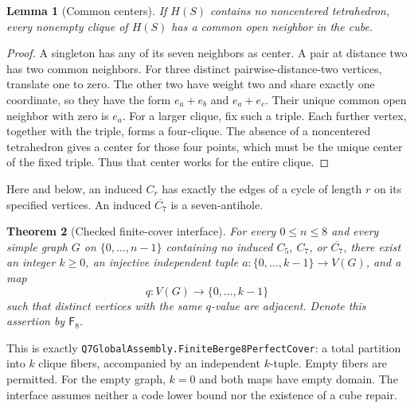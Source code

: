 \documentclass[11pt]{article}
\newtheorem{theorem}{Theorem}[section]
\newtheorem{lemma}[theorem]{Lemma}
\theoremstyle{definition}\newtheorem{definition}[theorem]{Definition}
\theoremstyle{remark}\newtheorem{remark}[theorem]{Remark}
\newcommand{\src}[1]{{\small\nolinkurl{#1}}}
\newcommand{\F}{\mathsf{F}_{8}}
\begin{document}
\begin{lemma}[Common centers]\label{lem:centers}
If $H(S)$ contains no noncentered tetrahedron, every nonempty clique of $H(S)$ has a common open neighbor in the cube.
\end{lemma}
\begin{proof}
A singleton has any of its seven neighbors as center. A pair at distance two has two common neighbors. For three distinct pairwise-distance-two vertices, translate one to zero. The other two have weight two and share exactly one coordinate, so they have the form $e_a+e_b$ and $e_a+e_c$. Their unique common open neighbor with zero is $e_a$. For a larger clique, fix such a triple. Each further vertex, together with the triple, forms a four-clique. The absence of a noncentered tetrahedron gives a center for those four points, which must be the unique center of the fixed triple. Thus that center works for the entire clique.
\end{proof}
Here and below, an induced $C_r$ has exactly the edges of a cycle of length $r$ on its specified vertices. An induced $\overline{C_7}$ is a seven-antihole.

\begin{theorem}[Checked finite-cover interface]\label{hyp:F}
For every $0\le n\le8$ and every simple graph $G$ on $\{0,\ldots,n-1\}$ containing no induced $C_5$, $C_7$, or $\overline{C_7}$, there exist an integer $k\ge0$, an injective independent tuple $a:\{0,\ldots,k-1\}\to V(G)$, and a map
\[
 q:V(G)\longrightarrow\{0,\ldots,k-1\}
\]
such that distinct vertices with the same $q$-value are adjacent. Denote this assertion by $\F$.
\end{theorem}
This is exactly \src{Q7GlobalAssembly.FiniteBerge8PerfectCover}: a total partition into $k$ clique fibers, accompanied by an independent $k$-tuple. Empty fibers are permitted. For the empty graph, $k=0$ and both maps have empty domain. The interface assumes neither a code lower bound nor the existence of a cube repair.
\end{document}
